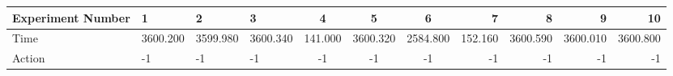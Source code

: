 \documentclass[8pt]{article}
\begin{document}
\begin{landscape}
\begin{tabular}{ | l | l | l | l | c | c | c | r | r | r | r | }
 \hline 
Experiment Number & 1 & 2 & 3 & 4 & 5 & 6 & 7 & 8 & 9 & 10\\ \hline
Time & 3600.200 & 3599.980 & 3600.340 & 141.000 & 3600.320 & 2584.800 & 152.160 & 3600.590 & 3600.010 & 3600.800\\ \hline
Action & -1 & -1 & -1 & -1 & -1 & -1 & -1 & -1 & -1 & -1\\ \hline\end{tabular}
\end{landscape}
\end{document}

